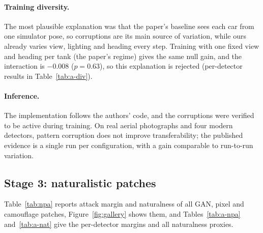 \documentclass[11pt,a4paper]{article}
\begin{document}
\paragraph{Training diversity.} The most plausible explanation was that the paper's baseline sees each car from one simulator pose, so corruptions are its main source of variation, while ours already varies view, lighting and heading every step. Training with one fixed view and heading per tank (the paper's regime) gives the same null gain, and the interaction is $-0.008$ ($p=0.63$), so this explanation is rejected (per-detector results in Table~\ref{tab:a-div}).

\paragraph{Inference.} The implementation follows the authors' code, and the corruptions were verified to be active during training. On real aerial photographs and four modern detectors, pattern corruption does not improve transferability; the published evidence is a single run per configuration, with a gain comparable to run-to-run variation.

\subsection{Stage 3: naturalistic patches}\label{sec:res-npa}
Table~\ref{tab:npa} reports attack margin and naturalness of all GAN, pixel and camouflage patches, Figure~\ref{fig:gallery} shows them, and Tables~\ref{tab:a-npa} and~\ref{tab:a-nat} give the per-detector margins and all naturalness proxies.
\end{document}
